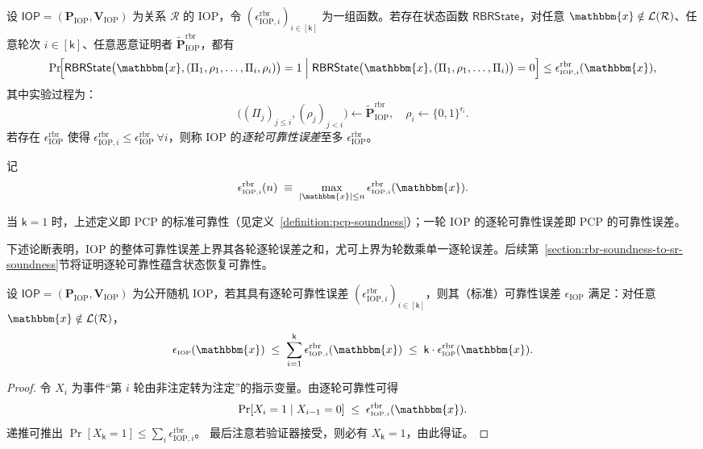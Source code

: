 \documentclass[american,singlepageview]{snargs-book-zh}
\newcommand{\Malicious}[1]{\tilde{#1}}
\newcommand{\RandomVariableX}{X}
\newcommand{\Relation}{\mathcal{R}}
\newcommand{\Language}{\mathcal{L}}
\newcommand{\Instance}{\mathbbm{x}}
\newcommand{\ProtoProver}{P}
\newcommand{\ProtoVerifier}{V}
\newcommand{\ProtoSoundnessError}{\epsilon}
\newcommand{\ProtoRoundComplexity}{\mathsf{k}}
\newcommand{\ProtoRandomnessComplexity}{\mathsf{r}}
\newcommand{\RoundIndex}{i}
\newcommand{\ProtoRBRSoundnessError}{\ProtoSoundnessError^{\RBRSuperscript}}
\newcommand{\IOPSymbol}{\mathsf{IOP}}
\newcommand{\IOPSubscript}{\scriptscriptstyle\mathrm{IOP}}
\newcommand{\IOPFormat}[1]{\mathbf{#1}}
\newcommand{\IOPProver}{\IOPFormat{\ProtoProver}_{\IOPSubscript}}
\newcommand{\IOPVerifier}{\IOPFormat{\ProtoVerifier}_{\IOPSubscript}}
\newcommand{\IOPMaliciousProver}{\Malicious{\IOPFormat{\ProtoProver}}_{\IOPSubscript}}
\newcommand{\IOPSystem}{(\IOPProver,\IOPVerifier)}
\newcommand{\IOPString}{\Pi}
\newcommand{\IOPVerifierRandomMessage}{\rho}
\newcommand{\IOPSoundnessError}{\ProtoSoundnessError_{\IOPSubscript}}
\newcommand{\IOPRoundComplexity}{\ProtoRoundComplexity}
\newcommand{\IOPRandomnessComplexity}{\ProtoRandomnessComplexity}
\newcommand{\RBRSuperscript}{\mathrm{rbr}}
\newcommand{\RBRState}{\mathsf{RBRState}}
\newcommand{\RBRSoundnessError}{\ProtoRBRSoundnessError_{\IOPSubscript}}
\newcommand{\RBRSoundnessErrorIdx}[1]{\ProtoRBRSoundnessError_{\IOPSubscript,#1}}
\newcommand{\IOPMaliciousRBRProver}{\IOPMaliciousProver^{\RBRSuperscript}}
\begin{document}
\begin{definition}
\label{def:iop-round-by-round-soundness}
设 $\IOPSymbol=\IOPSystem$ 为关系 $\Relation$ 的 IOP，令 $(\RBRSoundnessErrorIdx{\RoundIndex})_{\RoundIndex\in[\IOPRoundComplexity]}$ 为一组函数。若存在状态函数 $\RBRState$，对任意 $\Instance\notin\Language(\Relation)$、任意轮次 $\RoundIndex\in[\IOPRoundComplexity]$、任意恶意证明者 $\IOPMaliciousRBRProver$，都有
\[
\Pr\!\Bigl[
  \RBRState\bigl(
    \Instance,(\IOPString_{1},\IOPVerifierRandomMessage_{1},\dots,\IOPString_{\RoundIndex},\IOPVerifierRandomMessage_{\RoundIndex})
  \bigr)=1
  \;\Big|\;
  \RBRState\bigl(
    \Instance,(\IOPString_{1},\IOPVerifierRandomMessage_{1},\dots,\IOPString_{\RoundIndex})
  \bigr)=0
\Bigr]
\le
\RBRSoundnessErrorIdx{\RoundIndex}(\Instance),
\]
其中实验过程为：
\[
\bigl((\IOPString_{j})_{j\le\RoundIndex},(\IOPVerifierRandomMessage_{j})_{j<\RoundIndex}\bigr)
\gets \IOPMaliciousRBRProver, 
\quad
\IOPVerifierRandomMessage_{\RoundIndex}\gets\{0,1\}^{\IOPRandomnessComplexity_{\RoundIndex}}.
\]
若存在 $\RBRSoundnessError$ 使得
$\RBRSoundnessErrorIdx{\RoundIndex}\le \RBRSoundnessError\ \forall\RoundIndex$，则称 IOP 的\emph{逐轮可靠性误差}至多 $\RBRSoundnessError$。

记
\[
  \RBRSoundnessErrorIdx{\RoundIndex}(n)\;\equiv\;\max_{|\Instance|\le n}\RBRSoundnessErrorIdx{\RoundIndex}(\Instance).
\]
\end{definition}

当 $\IOPRoundComplexity=1$ 时，上述定义即 PCP 的标准可靠性（见定义~\ref{definition:pcp-soundness}）；一轮 IOP 的逐轮可靠性误差即 PCP 的可靠性误差。

下述论断表明，IOP 的整体可靠性误差上界其各轮逐轮误差之和，尤可上界为轮数乘单一逐轮误差。后续第~\ref{section:rbr-soundness-to-sr-soundness}节将证明逐轮可靠性蕴含状态恢复可靠性。

\begin{claim}
\label{claim:rbr-soundness-to-soundness}
设 $\IOPSymbol=\IOPSystem$ 为公开随机 IOP，若其具有逐轮可靠性误差
$(\RBRSoundnessErrorIdx{\RoundIndex})_{\RoundIndex\in[\IOPRoundComplexity]}$，则其（标准）可靠性误差 $\IOPSoundnessError$ 满足：对任意 $\Instance\notin\Language(\Relation)$，
\[
  \IOPSoundnessError(\Instance)
  \;\le\;
  \sum_{\RoundIndex=1}^{\IOPRoundComplexity}
    \RBRSoundnessErrorIdx{\RoundIndex}(\Instance)
  \;\le\;
  \IOPRoundComplexity\cdot\RBRSoundnessError(\Instance).
\]
\end{claim}

\begin{proof}
令 $\RandomVariableX_{\RoundIndex}$ 为事件“第 $\RoundIndex$ 轮由非注定转为注定”的指示变量。由逐轮可靠性可得
\[
  \Pr[\RandomVariableX_{\RoundIndex}=1 \mid \RandomVariableX_{\RoundIndex-1}=0]
  \;\le\;
  \RBRSoundnessErrorIdx{\RoundIndex}(\Instance).
\]
递推可推出
$\Pr[\RandomVariableX_{\IOPRoundComplexity}=1]\le\sum_{\RoundIndex}\RBRSoundnessErrorIdx{\RoundIndex}$。
最后注意若验证器接受，则必有
$\RandomVariableX_{\IOPRoundComplexity}=1$，由此得证。
\end{proof}
\end{document}
